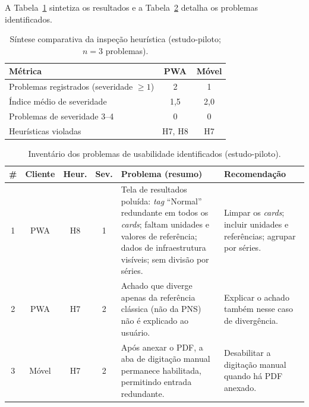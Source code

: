 \documentclass[12pt]{article}
\begin{document}
A Tabela~\ref{tab:usabilidade} sintetiza os resultados e a
Tabela~\ref{tab:inventario_c} detalha os problemas identificados.

\begin{table}[H]
\centering
\caption{Síntese comparativa da inspeção heurística (estudo-piloto; $n=3$ problemas).}
\label{tab:usabilidade}
\footnotesize
\begin{tabular}{|p{6.8cm}|c|c|}
\hline
\textbf{Métrica} & \textbf{PWA} & \textbf{Móvel} \\ \hline
Problemas registrados (severidade $\geq 1$) & 2 & 1 \\ \hline
Índice médio de severidade & 1,5 & 2,0 \\ \hline
Problemas de severidade 3--4 & 0 & 0 \\ \hline
Heurísticas violadas & H7, H8 & H7 \\ \hline
\end{tabular}
\end{table}

\begin{table}[H]
\centering
\caption{Inventário dos problemas de usabilidade identificados (estudo-piloto).}
\label{tab:inventario_c}
\scriptsize
\setlength{\tabcolsep}{3pt}
\begin{tabular}{|c|c|c|c|p{4.9cm}|p{4.0cm}|}
\hline
\textbf{\#} & \textbf{Cliente} & \textbf{Heur.} & \textbf{Sev.} & \textbf{Problema (resumo)} & \textbf{Recomendação} \\ \hline
1 & PWA & H8 & 1 & Tela de resultados poluída: \emph{tag} ``Normal'' redundante em todos os \emph{cards}; faltam unidades e valores de referência; dados de infraestrutura visíveis; sem divisão por séries. & Limpar os \emph{cards}; incluir unidades e referências; agrupar por séries. \\ \hline
2 & PWA & H7 & 2 & Achado que diverge apenas da referência clássica (não da PNS) não é explicado ao usuário. & Explicar o achado também nesse caso de divergência. \\ \hline
3 & Móvel & H7 & 2 & Após anexar o PDF, a aba de digitação manual permanece habilitada, permitindo entrada redundante. & Desabilitar a digitação manual quando há PDF anexado. \\ \hline
\end{tabular}
\end{table}
\end{document}
